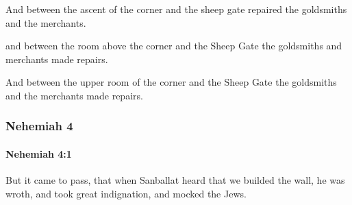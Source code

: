 			\begin{versebox}
					\item[BHS] 
					\item[LXX] 
					\item[ASV] And between the ascent of the corner and the sheep gate repaired the goldsmiths and the merchants.
					\item[NIV] and between the room above the corner and the Sheep Gate the goldsmiths and merchants made repairs.
					\item[NRSV] And between the upper room of the corner and the Sheep Gate the goldsmiths and the merchants made repairs.
			\end{versebox}
	\subsubsection{Nehemiah 4} %
		\label{NEHEMIAH-4}

		\paragraph{Nehemiah 4:1} %
			\label{NEHEMIAH-4-1}

			But it came to pass, that when Sanballat heard that we builded the wall, he was wroth, and took great indignation, and mocked the Jews.

